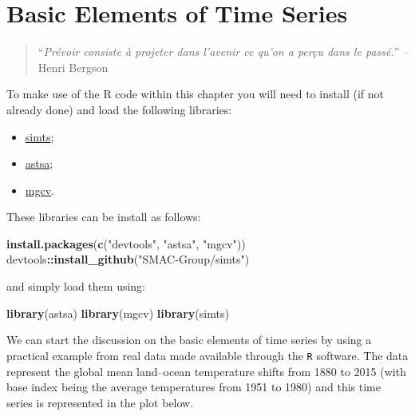 \documentclass[]{book}
\newenvironment{Shaded}{\begin{snugshade}}{\end{snugshade}}
\newcommand{\KeywordTok}[1]{\textcolor[rgb]{0.13,0.29,0.53}{\textbf{#1}}}
\newcommand{\StringTok}[1]{\textcolor[rgb]{0.31,0.60,0.02}{#1}}
\newcommand{\OperatorTok}[1]{\textcolor[rgb]{0.81,0.36,0.00}{\textbf{#1}}}
\newcommand{\NormalTok}[1]{#1}
\providecommand{\tightlist}{%
  \setlength{\itemsep}{0pt}\setlength{\parskip}{0pt}}
\theoremstyle{definition}
\theoremstyle{definition}
\theoremstyle{definition}
\theoremstyle{remark}
\let\BeginKnitrBlock\begin \let\EndKnitrBlock\end
\begin{document}
\chapter{Basic Elements of Time Series}\label{introtimeseries}

\begin{quote}
``\emph{Prévoir consiste à projeter dans l'avenir ce qu'on a perçu dans
le passé.}'' -- Henri Bergson
\end{quote}

\BeginKnitrBlock{rmdimportant}
To make use of the R code within this chapter you will need to install
(if not already done) and load the following libraries:

\begin{itemize}
\tightlist
\item
  \href{http://simts.smac-group.com/}{simts};
\item
  \href{https://cran.r-project.org/web/packages/astsa/index.html}{astsa};
\item
  \href{https://cran.r-project.org/web/packages/mgcv/index.html}{mgcv}.
\end{itemize}

These libraries can be install as follows:
\EndKnitrBlock{rmdimportant}

\begin{Shaded}
\begin{Highlighting}[]
\KeywordTok{install.packages}\NormalTok{(}\KeywordTok{c}\NormalTok{(}\StringTok{"devtools"}\NormalTok{, }\StringTok{"astsa"}\NormalTok{, }\StringTok{"mgcv"}\NormalTok{))}
\NormalTok{devtools}\OperatorTok{::}\KeywordTok{install_github}\NormalTok{(}\StringTok{"SMAC-Group/simts"}\NormalTok{)}
\end{Highlighting}
\end{Shaded}

and simply load them using:

\begin{Shaded}
\begin{Highlighting}[]
\KeywordTok{library}\NormalTok{(astsa)}
\KeywordTok{library}\NormalTok{(mgcv)}
\KeywordTok{library}\NormalTok{(simts)}
\end{Highlighting}
\end{Shaded}

We can start the discussion on the basic elements of time series by
using a practical example from real data made available through the
\texttt{R} software. The data represent the global mean land--ocean
temperature shifts from 1880 to 2015 (with base index being the average
temperatures from 1951 to 1980) and this time series is represented in
the plot below.
\end{document}
